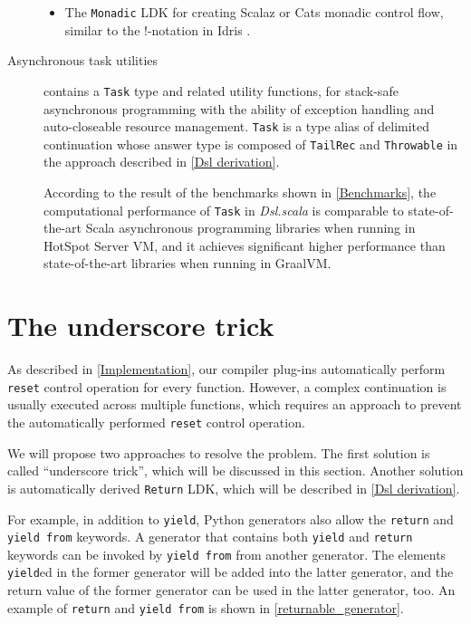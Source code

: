 \begin{description}
\begin{itemize}
    \item The \lstinline{Monadic} LDK for creating Scalaz \cite{kenji2017scalaz} or Cats \cite{typelevel2017cats} monadic control flow, similar to the !-notation in Idris \cite{brady2013idris}.
  \end{itemize}
  \item[Asynchronous task utilities] contains a \lstinline{Task} type and related utility functions, for stack-safe asynchronous programming with the ability of exception handling and auto-closeable resource management. \lstinline{Task} is a type alias of delimited continuation whose answer type is composed of \lstinline{TailRec} and \lstinline{Throwable} in the approach described in \cref{Dsl derivation}.

  According to the result of the benchmarks shown in \cref{Benchmarks}, the computational performance of \lstinline{Task} in \textit{Dsl.scala} is comparable to state-of-the-art Scala asynchronous programming libraries when running in HotSpot Server VM, and it achieves significant higher performance than state-of-the-art libraries when running in GraalVM.
\end{description}


\section{The underscore trick}\label{The underscore trick}

As described in \cref{Implementation}, our compiler plug-ins automatically perform \lstinline{reset} control operation for every function. However, a complex continuation is usually executed across multiple functions, which requires an approach to prevent the automatically performed \lstinline{reset} control operation.

We will propose two approaches to resolve the problem. The first solution is called ``underscore trick'', which will be discussed in this section. Another solution is automatically derived \lstinline{Return} LDK, which will be described in \cref{Dsl derivation}.

For example, in addition to \lstinline{yield}, Python generators also allow the \lstinline{return} and \lstinline{yield from} keywords. A generator that contains both \lstinline{yield} and \lstinline{return} keywords can be invoked by \lstinline{yield from} from another generator. The elements \lstinline{yield}ed in the former generator will be added into the latter generator, and the return value of the former generator can be used in the latter generator, too. An example of \lstinline{return} and \lstinline{yield from} is shown in \cref{returnable_generator}.

